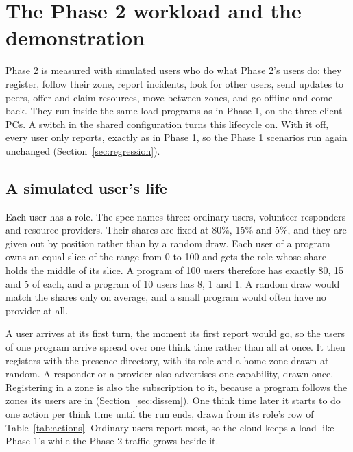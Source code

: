 \section{The Phase 2 workload and the demonstration}
\label{sec:workload}

Phase 2 is measured with simulated users who do what Phase 2's users do: they register, follow their zone, report incidents, look for other users, send updates to peers, offer and claim resources, move between zones, and go offline and come back. They run inside the same load programs as in Phase 1, on the three client PCs. A switch in the shared configuration turns this lifecycle on. With it off, every user only reports, exactly as in Phase 1, so the Phase 1 scenarios run again unchanged (Section~\ref{sec:regression}).

\subsection{A simulated user's life}
\label{sec:lifecycle}

Each user has a role. The spec names three: ordinary users, volunteer responders and resource providers. Their shares are fixed at 80\%, 15\% and 5\%, and they are given out by position rather than by a random draw. Each user of a program owns an equal slice of the range from 0 to 100 and gets the role whose share holds the middle of its slice. A program of 100 users therefore has exactly 80, 15 and 5 of each, and a program of 10 users has 8, 1 and 1. A random draw would match the shares only on average, and a small program would often have no provider at all.

A user arrives at its first turn, the moment its first report would go, so the users of one program arrive spread over one think time rather than all at once. It then registers with the presence directory, with its role and a home zone drawn at random. A responder or a provider also advertises one capability, drawn once. Registering in a zone is also the subscription to it, because a program follows the zones its users are in (Section~\ref{sec:dissem}). One think time later it starts to do one action per think time until the run ends, drawn from its role's row of Table~\ref{tab:actions}. Ordinary users report most, so the cloud keeps a load like Phase 1's while the Phase 2 traffic grows beside it.

